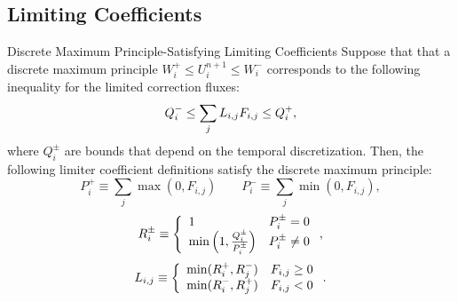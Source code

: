 \subsection{Limiting Coefficients}\label{L}
\begin{theorem}{Discrete Maximum Principle-Satisfying Limiting Coefficients}
   Suppose that that a discrete maximum principle $W_i^+\le U_i^{n+1}\le W_i^-$
   corresponds to the following inequality for the limited correction fluxes:
   \begin{equation}
      Q_i^- \le \sum\limits_j L_{i,j} F_{i,j} \le Q_i^+,
   \end{equation}
   where $Q_i^\pm$ are bounds that depend on the temporal discretization. Then,
   the following limiter coefficient definitions satisfy the discrete maximum
   principle:
   \begin{equation}\label{P_defs}
      P_i^+ \equiv \sum\limits_j\max(0,F_{i,j}) \qquad
      P_i^- \equiv \sum\limits_j\min(0,F_{i,j}),
   \end{equation}
   \begin{equation}\label{R_defs}
      R_i^\pm \equiv\left\{
         \begin{array}{l l}
            1                                          & P_i^\pm = 0\\
            \min\left(1,\frac{Q_i^\pm}{P_i^\pm}\right) & P_i^\pm \ne 0
         \end{array}
         \right.,
   \end{equation}
   \begin{equation}\label{L_defs}
      L_{i,j} \equiv\left\{
         \begin{array}{l l}
            \min(R_i^+,R_j^-) & F_{i,j} \geq 0\\
            \min(R_i^-,R_j^+) & F_{i,j} < 0
         \end{array}
         \right..
   \end{equation}  
\end{theorem}

